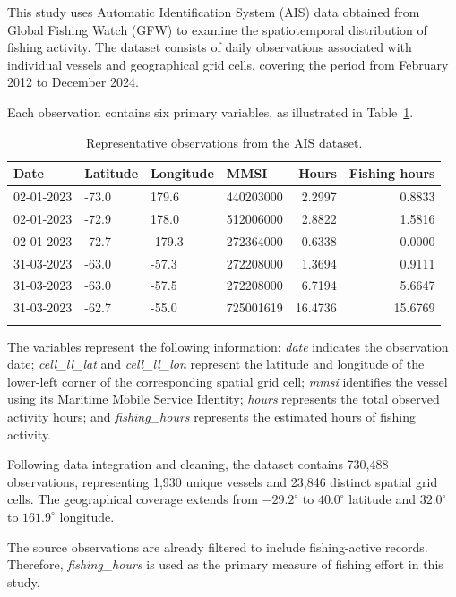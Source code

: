 \documentclass[pdflatex,sn-mathphys-num]{sn-jnl}
\theoremstyle{thmstyleone}
\theoremstyle{thmstyletwo}
\theoremstyle{thmstylethree}
\begin{document}
This study uses Automatic Identification System (AIS) data
obtained from Global Fishing Watch (GFW) to examine the
spatiotemporal distribution of fishing activity. The dataset
consists of daily observations associated with individual
vessels and geographical grid cells, covering the period
from February 2012 to December 2024.

Each observation contains six primary variables, as
illustrated in Table~\ref{tab:dataset-sample}.

\begin{table}[t]
\caption{Representative observations from the AIS dataset.}
\label{tab:dataset-sample}
\begin{tabular}{llllrr}
\toprule
Date & Latitude & Longitude & MMSI & Hours & Fishing hours \\
\midrule
02-01-2023 & -73.0 & 179.6  & 440203000 & 2.2997  & 0.8833 \\
02-01-2023 & -72.9 & 178.0  & 512006000 & 2.8822  & 1.5816 \\
02-01-2023 & -72.7 & -179.3 & 272364000 & 0.6338  & 0.0000 \\
31-03-2023 & -63.0 & -57.3  & 272208000 & 1.3694  & 0.9111 \\
31-03-2023 & -63.0 & -57.5  & 272208000 & 6.7194  & 5.6647 \\
31-03-2023 & -62.7 & -55.0  & 725001619 & 16.4736 & 15.6769 \\
\botrule
\end{tabular}
\end{table}

The variables represent the following information:
\textit{date} indicates the observation date;
\textit{cell\_ll\_lat} and \textit{cell\_ll\_lon}
represent the latitude and longitude of the lower-left
corner of the corresponding spatial grid cell;
\textit{mmsi} identifies the vessel using its Maritime
Mobile Service Identity; \textit{hours} represents
the total observed activity hours; and
\textit{fishing\_hours} represents the estimated
hours of fishing activity.

Following data integration and cleaning, the dataset
contains 730,488 observations, representing 1,930
unique vessels and 23,846 distinct spatial grid cells.
The geographical coverage extends from
$-29.2^\circ$ to $40.0^\circ$ latitude and
$32.0^\circ$ to $161.9^\circ$ longitude.

The source observations are already filtered to
include fishing-active records. Therefore,
\textit{fishing\_hours} is used as the primary
measure of fishing effort in this study.
\end{document}
